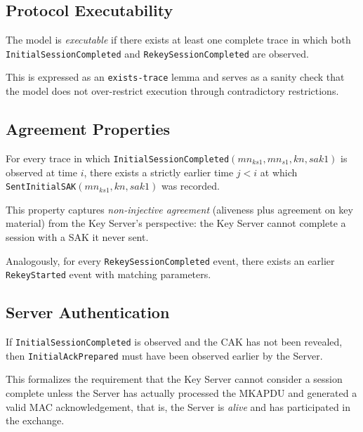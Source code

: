 \subsection{Protocol Executability}

\begin{definition}[Executability]
The model is \emph{executable} if there exists at least one complete trace in which both \texttt{InitialSessionCompleted} and \texttt{RekeySessionCompleted} are observed.
\end{definition}

This is expressed as an \texttt{exists-trace} lemma and serves as a sanity check that the model does not over-restrict execution through contradictory restrictions.

\subsection{Agreement Properties}

\begin{definition}
For every trace in which \texttt{InitialSessionCompleted}$(mn_{ks1}, mn_{s1}, kn, sak1)$ is observed at time $i$, there exists a strictly earlier time $j < i$ at which \texttt{SentInitialSAK}$(mn_{ks1}, kn, sak1)$ was recorded.
\end{definition}

This property captures \emph{non-injective agreement} (aliveness plus agreement on key material) from the Key Server's perspective: the Key Server cannot complete a session with a SAK it never sent.

\begin{definition}
Analogously, for every \texttt{RekeySessionCompleted} event, there exists an earlier \texttt{RekeyStarted} event with matching parameters.
\end{definition}

\subsection{Server Authentication}

\begin{definition}
If \texttt{InitialSessionCompleted} is observed and the CAK has not been revealed, then \texttt{InitialAckPrepared} must have been observed earlier by the Server.
\end{definition}

This formalizes the requirement that the Key Server cannot consider a session complete unless the Server has actually processed the MKAPDU and generated a valid MAC acknowledgement, that is, the Server is \emph{alive} and has participated in the exchange.

